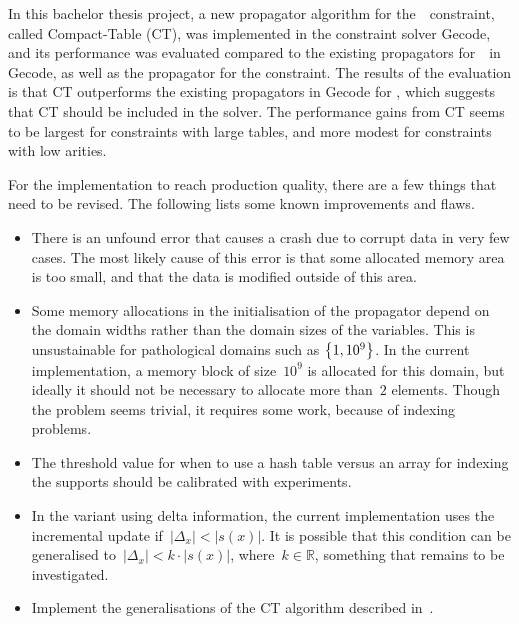 \documentclass[a4paper,11pt]{article}
\newcommand{\Table}{\Constraint{Table}}
\numberwithin{equation}{section}
\begin{document}
In this bachelor thesis project, a new propagator algorithm for the~\Table~constraint,
called Compact-Table (CT), was implemented in the constraint solver Gecode, and its performance
was evaluated compared to the existing propagators for~\Table~in Gecode, as well
as the propagator for the  constraint.
The results of the evaluation is that CT outperforms the existing propagators
in Gecode for \Table, which suggests that CT should be included in the solver.
The performance gains from CT seems to be largest for constraints with large tables,
and more modest for constraints with low arities.

For the implementation to reach production quality, there
are a few things that need to be revised. The following lists some known
improvements and flaws.

\begin{itemize}
  \item There is an unfound error that causes a crash due to corrupt data 
    in very few cases.
    The most likely cause of this error is that some allocated memory area
    is too small, and that the data is modified outside of this area.
    
  \item Some memory allocations in the initialisation of the propagator
    depend on the domain widths rather
    than the domain sizes of the variables. This is unsustainable
    for pathological domains such as $\left\{1, 10^9\right\}$. In the current
    implementation, a memory block of size~$10^9$ is allocated for this
    domain, but ideally it should not be necessary to allocate more than~$2$
    elements. Though the problem seems trivial, it requires some
    work, because of indexing problems.

  \item The threshold value for when to use a hash table versus
    an array for indexing the supports should be calibrated with
    experiments.

  \item In the variant using delta information, the current implementation
    uses the incremental update if~$|\Delta_x| < |s(x)|$. It is possible
    that this condition can be generalised to~$|\Delta_x| < k \cdot |s(x)|$,
    where~$k \in \mathbb{R}$, something that remains to be investigated.
    
  \item Implement the generalisations of the CT algorithm described
    in~\cite{DBLP:conf/aaai/VerhaegheLS17}.

\end{itemize}
\end{document}
